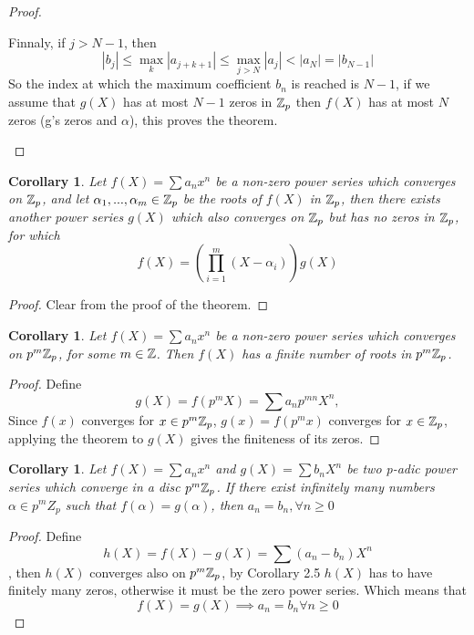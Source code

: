 \documentclass[a4paper]{article}
\theoremstyle{plain}
\newtheorem{Cor}[thm]{Corollary}
\theoremstyle{definition}
\begin{document}
\begin{proof}
\begin{itemize}
          Finnaly, if $j > N-1$, then
          $$|b_{j}| \leq \max_{k}|a_{j+k+1}| \leq \max_{j > N}|a_{j}| < |a_{N}| = |b_{N-1}|$$
      So the index at which the maximum coefficient $b_{n}$ is reached is $N-1$, if we assume that $g(X)$ has at most $N-1$ zeros in $\Bbb Z_{p}$ then $f(X)$ has at most $N$ zeros (g's zeros and $\alpha$), this proves the theorem.
  \end{itemize}
\end{proof}
\begin{Cor}
  Let $f(X) = \sum a_{n}x^{n}$ be a non-zero power series which converges on $\Bbb Z_{p}$, and let $\alpha_{1}, ..., \alpha_{m} \in \Bbb Z_{p}$ be the roots of $f(X)$ in $\Bbb Z_{p}$, then there exists another power series $g(X)$ which also converges on $\Bbb Z_{p}$ but has no zeros in $\Bbb Z_{p}$, for which
  $$f(X) = \left(\prod_{i=1}^{m}(X-\alpha_{i})\right)g(X)$$
\end{Cor}
\begin{proof}
  Clear from the proof of the theorem.
\end{proof}
\begin{Cor}
  Let $f(X) = \sum a_{n}x^{n}$ be a non-zero power series which converges on $p^{m}\Bbb Z_{p}$, for some $m \in \Bbb Z$. Then $f(X)$ has a finite number of roots in $p^{m} \Bbb Z_{p}$.
\end{Cor}
\begin{proof}
  Define $$g(X) = f(p^{m}X) = \sum a_{n}p^{mn}X^{n},$$
  Since $f(x)$ converges for $x \in p^{m}\Bbb Z_{p}$, $g(x) = f(p^{m}x)$ converges for $x \in \Bbb Z_{p}$, applying the theorem to $g(X)$ gives the finiteness of its zeros.
\end{proof}
\begin{Cor}
  Let $f(X) = \sum a_{n}x^{n}$ and $g(X) = \sum b_{n}X^{n}$ be two p-adic power series which converge in a disc $p^{m}\Bbb Z_{p}$. If there exist infinitely many numbers $\alpha \in p^{m}Z_{p}$ such that $f(\alpha) = g(\alpha)$, then $a_{n} = b_{n}, \forall n \geq 0$
\end{Cor}
\begin{proof}
  Define $$h(X) = f(X) - g(X) = \sum(a_{n}-b_{n})X^{n}$$, then $h(X)$ converges also on $p^{m}\Bbb Z_{p}$, by Corollary 2.5 $h(X)$ has to have finitely many zeros, otherwise it must be the zero power series. Which means that
  $$f(X) = g(X) \implies a_{n} = b_{n} \forall n \geq 0$$
\end{proof}
\end{document}
